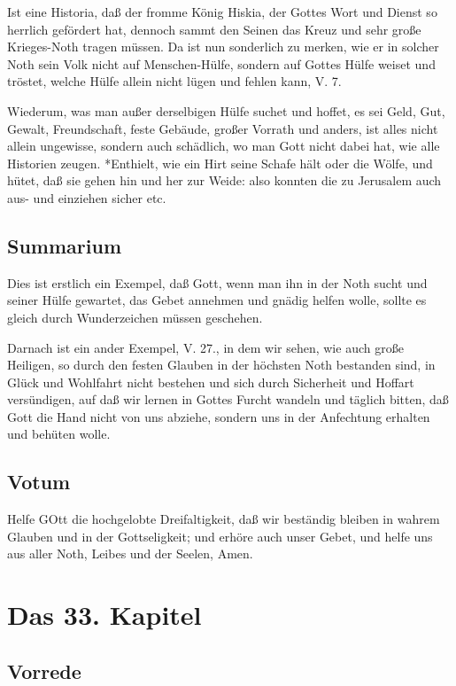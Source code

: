 Ist eine Historia, daß der fromme König Hiskia, der Gottes Wort und Dienst so herrlich gefördert hat, dennoch sammt den Seinen das Kreuz und sehr große Krieges-Noth tragen müssen. Da ist nun sonderlich zu merken, wie er in solcher Noth sein Volk nicht auf Menschen-Hülfe, sondern auf Gottes Hülfe weiset und tröstet, welche Hülfe allein nicht lügen und fehlen kann, V. 7.

Wiederum, was man außer derselbigen Hülfe suchet und hoffet, es sei Geld, Gut, Gewalt, Freundschaft, feste Gebäude, großer Vorrath und anders, ist alles nicht allein ungewisse, sondern auch schädlich, wo man Gott nicht dabei hat, wie alle Historien zeugen.
*Enthielt, wie ein Hirt seine Schafe hält oder die Wölfe, und hütet, daß sie gehen hin und her zur Weide: also konnten die zu Jerusalem auch aus- und einziehen sicher etc.

\section{Summarium}

Dies ist erstlich ein Exempel, daß Gott, wenn man ihn in der Noth sucht und seiner Hülfe gewartet, das Gebet annehmen und gnädig helfen wolle, sollte es gleich durch Wunderzeichen müssen geschehen.

Darnach ist ein ander Exempel, V. 27., in dem wir sehen, wie auch große Heiligen, so durch den festen Glauben in der höchsten Noth bestanden sind, in Glück und Wohlfahrt nicht bestehen und sich durch Sicherheit und Hoffart versündigen, auf daß wir lernen in Gottes Furcht wandeln und täglich bitten, daß Gott die Hand nicht von uns abziehe, sondern uns in der Anfechtung erhalten und behüten wolle.

\section{Votum}

Helfe GOtt die hochgelobte Dreifaltigkeit, daß wir beständig bleiben in wahrem Glauben und in der Gottseligkeit; und erhöre auch unser Gebet, und helfe uns aus aller Noth, Leibes und der Seelen, Amen.

\chapter{Das 33. Kapitel}

\section{Vorrede}

